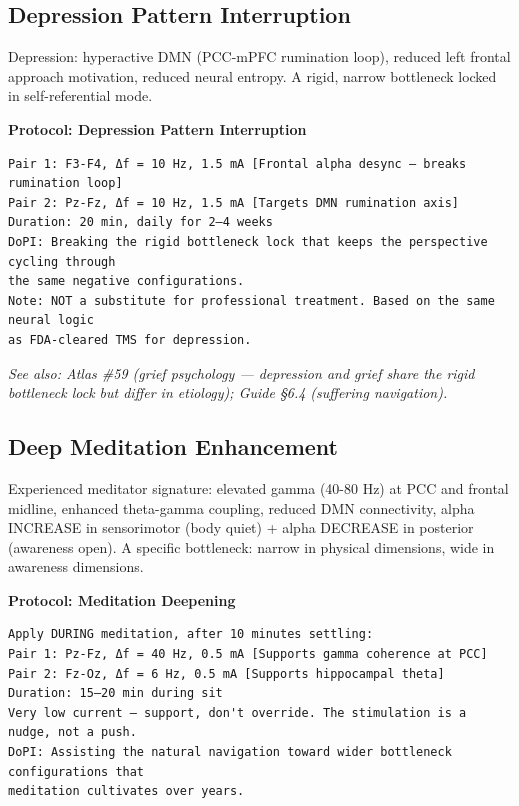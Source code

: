 \subsection*{Depression Pattern Interruption}


Depression: hyperactive DMN (PCC-mPFC rumination loop), reduced left frontal approach motivation, reduced neural entropy. A rigid, narrow bottleneck locked in self-referential mode.


\textbf{Protocol: Depression Pattern Interruption}

\begin{verbatim}
Pair 1: F3-F4, Δf = 10 Hz, 1.5 mA [Frontal alpha desync — breaks rumination loop]
Pair 2: Pz-Fz, Δf = 10 Hz, 1.5 mA [Targets DMN rumination axis]
Duration: 20 min, daily for 2–4 weeks
DoPI: Breaking the rigid bottleneck lock that keeps the perspective cycling through 
the same negative configurations.
Note: NOT a substitute for professional treatment. Based on the same neural logic 
as FDA-cleared TMS for depression.
\end{verbatim}


\textit{See also: Atlas \#59 (grief psychology — depression and grief share the rigid bottleneck lock but differ in etiology); Guide §6.4 (suffering navigation).}


\subsection*{Deep Meditation Enhancement}


Experienced meditator signature: elevated gamma (40-80 Hz) at PCC and frontal midline, enhanced theta-gamma coupling, reduced DMN connectivity, alpha INCREASE in sensorimotor (body quiet) + alpha DECREASE in posterior (awareness open). A specific bottleneck: narrow in physical dimensions, wide in awareness dimensions.


\textbf{Protocol: Meditation Deepening}

\begin{verbatim}
Apply DURING meditation, after 10 minutes settling:
Pair 1: Pz-Fz, Δf = 40 Hz, 0.5 mA [Supports gamma coherence at PCC]
Pair 2: Fz-Oz, Δf = 6 Hz, 0.5 mA [Supports hippocampal theta]
Duration: 15–20 min during sit
Very low current — support, don't override. The stimulation is a nudge, not a push.
DoPI: Assisting the natural navigation toward wider bottleneck configurations that 
meditation cultivates over years.
\end{verbatim}


